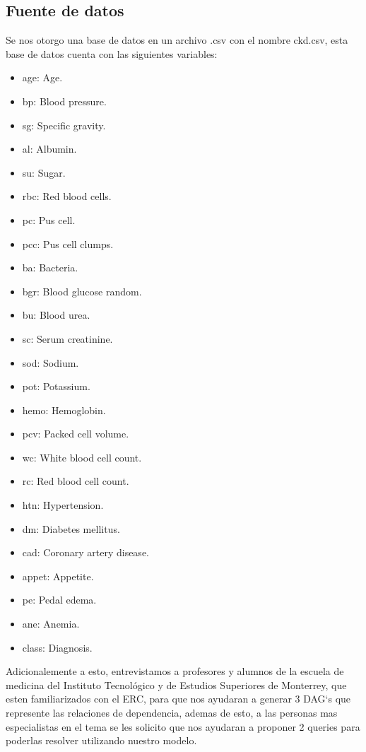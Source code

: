 \documentclass{Academic}
\begin{document}
\subsection{Fuente de datos}
Se nos otorgo una base de datos en un archivo .csv con el nombre ckd.csv, esta base de datos cuenta con las siguientes variables:
\begin{itemize}
    \item age: Age.
    \item bp: Blood pressure.
    \item sg: Specific gravity.
    \item al: Albumin.
    \item su: Sugar.
    \item rbc: Red blood cells.
    \item pc: Pus cell.
    \item pcc: Pus cell clumps.
    \item ba: Bacteria.
    \item bgr: Blood glucose random.
    \item bu: Blood urea.
    \item sc: Serum creatinine.
    \item sod: Sodium.
    \item pot: Potassium.
    \item hemo: Hemoglobin.
    \item pcv: Packed cell volume.
    \item wc: White blood cell count.
    \item rc: Red blood cell count.
    \item htn: Hypertension.
    \item dm: Diabetes mellitus.
    \item cad: Coronary artery disease.
    \item appet: Appetite.
    \item pe: Pedal edema.
    \item ane: Anemia.
    \item class: Diagnosis.
\end{itemize}
Adicionalemente a esto, entrevistamos a profesores y alumnos de la escuela de medicina del Instituto Tecnológico y de Estudios Superiores de Monterrey, que esten familiarizados con el ERC, para que nos ayudaran a generar 3 DAG`s que represente las relaciones de dependencia, ademas de esto, a las personas mas especialistas en el tema se les solicito que nos ayudaran a proponer 2 queries para poderlas resolver utilizando nuestro modelo.
\end{document}
